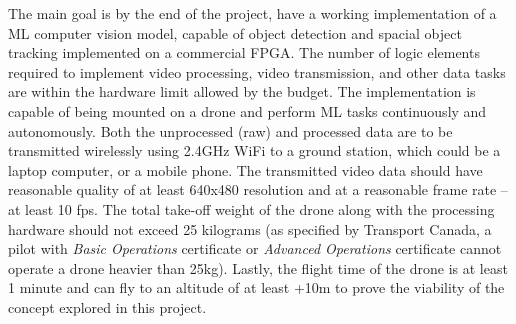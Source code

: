 The main goal is by the end of the project, have a working implementation
of a ML computer vision model, capable of object detection and spacial
object tracking implemented on a commercial FPGA. The number of logic elements 
required to implement video processing, video transmission, and other
data tasks are within the hardware limit allowed by the budget.
The implementation is capable of being mounted on a drone and perform ML
tasks continuously and autonomously. Both the unprocessed (raw) and processed
data are to be transmitted wirelessly using 2.4GHz WiFi to a ground station, 
which could be a laptop computer, or a mobile phone. The transmitted video
data should have reasonable quality of at least 640x480 resolution and at 
a reasonable frame rate -- at least 10 fps. The total take-off weight of the
drone along with the processing hardware should not exceed 25 kilograms
(as specified by Transport Canada, a pilot with \textit{Basic Operations}
certificate or \textit{Advanced Operations} certificate cannot operate a 
drone heavier than 25kg). Lastly, the flight time of the drone is at least 
1 minute and can fly to an altitude of at least +10m to prove the viability
of the concept explored in this project.